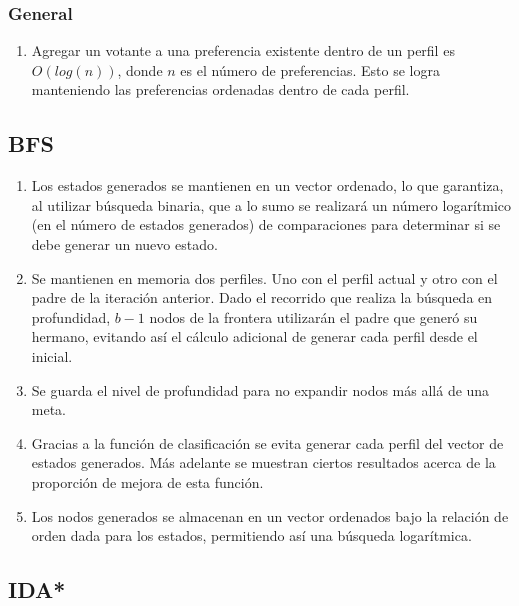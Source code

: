 \documentclass[letterpaper,12pt, titlepage]{article}
\begin{document}
\subsubsection*{General}
    \begin{enumerate}
       \item Agregar un votante a una preferencia existente dentro de un perfil
       es $O(log(n))$, donde $n$ es el número de preferencias. Esto se logra
       manteniendo las preferencias ordenadas dentro de cada perfil.
    \end{enumerate}

\subsection*{BFS}
    \begin{enumerate}
       \item Los estados generados se mantienen en un vector ordenado,
       lo que garantiza, al utilizar búsqueda binaria, que a lo sumo
       se realizará un número logarítmico (en el número de estados
       generados) de comparaciones para determinar si se debe generar un
       nuevo estado.

		\item Se mantienen en memoria dos perfiles. Uno con el perfil
		actual y otro con el padre de la iteración anterior. Dado el
		recorrido que realiza la búsqueda en profundidad, $b-1$ nodos
		de la frontera utilizarán el padre que generó su hermano, evitando
		así el cálculo adicional de generar cada perfil desde el inicial.
		
		\item Se guarda el nivel de profundidad para no expandir nodos más
		allá de una meta.
		
		\item Gracias a la función de clasificación se evita generar
		cada perfil del vector de estados generados. Más adelante se
		muestran ciertos resultados acerca de la proporción de mejora
		de esta función.

		\item Los nodos generados se almacenan en un vector ordenados
		bajo la relación de orden dada para los estados, permitiendo
		así una búsqueda logarítmica.
\end{enumerate}

\subsection*{IDA*}
\end{document}

